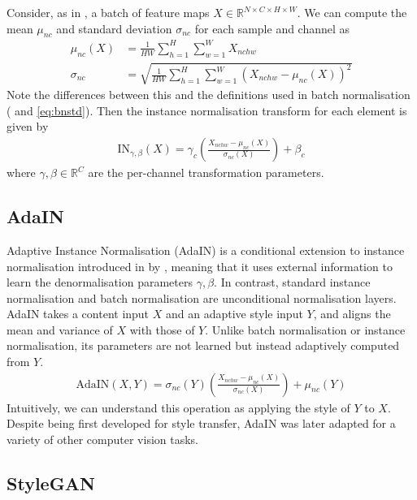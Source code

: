 Consider, as in , a batch of feature maps $X\in \mathbb{R}^{N \times C \times H \times W}$.
We can compute the mean $\mu_{nc}$ and standard deviation $\sigma_{nc}$ for each sample and channel as
\begin{align}
    \mu_{nc}(X) &= \frac{1}{HW} \sum_{h=1}^{H} \sum_{w=1}^W X_{nchw} \\
    \sigma_{nc} &= \sqrt{\frac{1}{HW} \sum_{h=1}^H \sum_{w=1}^W \left(X_{nchw}-\mu_{nc}(X)\right)^2}
\end{align}
Note the differences between this and the definitions used in batch normalisation ( and \eqref{eq:bnstd}). Then the instance normalisation transform for each element is given by
\begin{align}
    \text{IN}_{\gamma, \beta}(X) = \gamma_c \left( \frac{X_{nchw} - \mu_{nc}(X)}{\sigma_{nc}(X)} \right) + \beta_c
\end{align}
where $\gamma, \beta \in \mathbb{R}^C$ are the per-channel transformation parameters.

\subsection{AdaIN} \label{sec:adain}

Adaptive Instance Normalisation (AdaIN) is a conditional extension to instance normalisation introduced in \citeyear{adain} by \citeauthor{adain} \cite{adain}, meaning that it uses external information to learn the denormalisation parameters $\gamma, \beta$.
In contrast, standard instance normalisation and batch normalisation are unconditional normalisation layers.
AdaIN takes a content input $X$ and an adaptive style input $Y$, and aligns the mean and variance of $X$ with those of $Y$.
Unlike batch normalisation or instance normalisation, its parameters are not learned but instead adaptively computed from $Y$.
\begin{align}
    \text{AdaIN} (X, Y) = \sigma_{nc}(Y) \left( \frac{X_{nchw} - \mu_{nc}(X)}{\sigma_{nc}(X)} \right) + \mu_{nc}(Y)
\end{align}
Intuitively, we can understand this operation as applying the style of $Y$ to $X$. Despite being first developed for style transfer, AdaIN was later adapted for a variety of other computer vision tasks.

\subsection{StyleGAN} \label{sec:stylegan}

